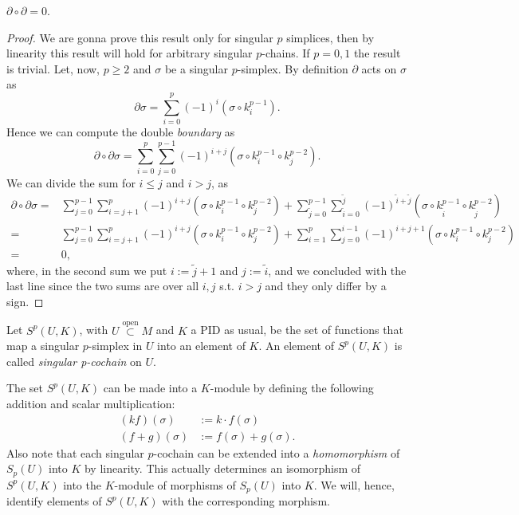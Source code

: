 \begin{lem}
	$\partial \circ \partial = 0$.
\end{lem}
\begin{proof}
	We are gonna prove this result only for singular $p$ simplices, then by linearity this result will hold for arbitrary singular $p$-chains.
	If $p = 0, 1$ the result is trivial.
	Let, now, $p \geq 2$ and $\sigma$ be a singular $p$-simplex.
	By definition $\partial$ acts on $\sigma$ as
	\begin{equation}
		\partial \sigma = \sum_{i=0}^{p} (-1)^i \left( \sigma \circ k_i^{p-1} \right)
	.\end{equation} 
	Hence we can compute the double \textit{boundary} as
	\begin{equation}
	\partial \circ \partial \sigma = \sum_{i=0}^{p} \sum_{j=0}^{p-1} (-1)^{i+j} \left( \sigma \circ k_i^{p-1} \circ k_j^{p-2} \right)
	.\end{equation} 
	We can divide the sum for $i \leq j$ and $i > j$, as
	\begin{align}
		\partial \circ \partial \sigma =& \sum_{j=0}^{p-1} \sum_{i=j+1}^{p} (-1)^{i+j} \left( \sigma \circ k_i^{p-1} \circ k_j^{p-2} \right) +
	\sum_{\tilde{j}=0}^{p-1} \sum_{\tilde{i}=0}^{\tilde{j}} (-1)^{\tilde{i} + \tilde{j}} \left( \sigma \circ k_{\tilde{i}}^{p-1} \circ k_{\tilde{j}}^{p-2} \right)\\
		=& \sum_{j=0}^{p-1} \sum_{i=j+1}^{p} (-1)^{i+j} \left( \sigma \circ k_i^{p-1} \circ k_j^{p-2} \right) + 
\sum_{i=1}^{p} \sum_{j=0}^{i-1} (-1)^{i+j+1} \left( \sigma \circ k_i^{p-1} \circ k_j^{p-2} \right)\\
		=& 0
	,\end{align} 
	where, in the second sum we put $i := \tilde{j} + 1$ and $j := \tilde{i}$, and we concluded with the last line since the two sums are over all $i,j$ s.t. $i > j$ and they only differ by a sign.
\end{proof}

\begin{defn}
	Let $S^p \left(U, K\right)$, with $U \stackrel{\text{open}}{\subset} M$ and $K$ a PID as usual, be the set of functions that map a singular $p$-simplex in $U$ into an element of $K$.
	An element of $S^p \left(U, K\right)$ is called \textit{singular p-cochain} on $U$.
\end{defn}

The set $S^p \left(U, K\right)$ can be made into a $K$-module by defining the following addition and scalar multiplication:
\begin{align}
	\left( kf \right) (\sigma) &:= k \cdot f(\sigma)\\
	\left( f + g \right) (\sigma) &:= f(\sigma) + g(\sigma)
.\end{align} 
Also note that each singular $p$-cochain can be extended into a \textit{homomorphism} of $S_p(U)$ into $K$ by linearity.
This actually determines an isomorphism of $S^p \left(U, K\right)$ into the $K$-module of morphisms of $S_p(U)$ into $K$.
We will, hence, identify elements of $S^p(U,K)$ with the corresponding morphism.

